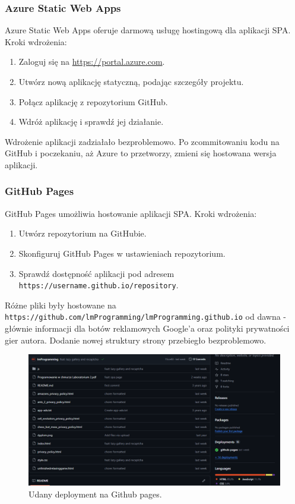\documentclass[a4paper,12pt]{article}
\begin{document}
\subsubsection{Azure Static Web Apps}
Azure Static Web Apps oferuje darmową usługę hostingową dla aplikacji SPA. Kroki wdrożenia:
\begin{enumerate}
    \item Zaloguj się na \url{https://portal.azure.com}.
    \item Utwórz nową aplikację statyczną, podając szczegóły projektu.
    \item Połącz aplikację z repozytorium GitHub.
    \item Wdróż aplikację i sprawdź jej działanie.
\end{enumerate}

Wdrożenie aplikacji zadziałało bezproblemowo. Po zcommitowaniu kodu na GitHub i poczekaniu, aż Azure to przetworzy, zmieni się hostowana wersja aplikacji.

\subsubsection{GitHub Pages}
GitHub Pages umożliwia hostowanie aplikacji SPA. Kroki wdrożenia:
\begin{enumerate}
    \item Utwórz repozytorium na GitHubie.
    \item Skonfiguruj GitHub Pages w ustawieniach repozytorium.
    \item Sprawdź dostępność aplikacji pod adresem \texttt{https://username.github.io/repository}.
\end{enumerate}

Różne pliki były hostowane na \texttt{https://github.com/lmProgramming/lmProgramming.github.io} od dawna - głównie informacji dla botów reklamowych Google'a oraz polityki prywatności gier autora. Dodanie nowej struktury strony przebiegło bezproblemowo.

\begin{figure}[H]
    \centering
    \includegraphics[width=1\textwidth]{images/github.png}
    \caption{Udany deployment na Github pages.}
\end{figure}
\end{document}
